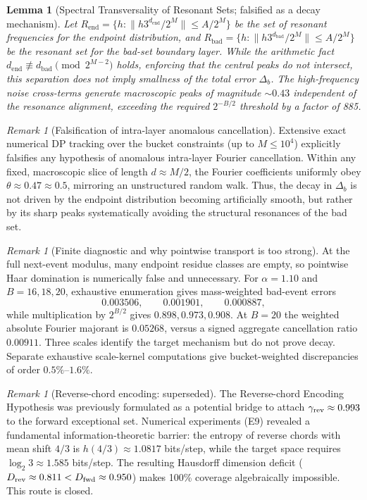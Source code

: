 \documentclass[12pt,a4paper]{article}
\newtheorem{lemma}[theorem]{Lemma}
\theoremstyle{remark}
\newtheorem{remark}[theorem]{Remark}
\begin{document}
\begin{lemma}[Spectral Transversality of Resonant Sets; falsified as a decay mechanism]
\label{lem:spectral_transversality}
Let $R_{\text{end}} = \{h : \|h 3^{d_{\text{end}}} / 2^M\| \le A/2^M\}$ be the set of resonant frequencies for the endpoint distribution, and $R_{\text{bad}} = \{h : \|h 3^{d_{\text{bad}}} / 2^M\| \le A/2^M\}$ be the resonant set for the bad-set boundary layer.
While the arithmetic fact $d_{\text{end}} \not\equiv d_{\text{bad}} \pmod{2^{M-2}}$ holds, enforcing that the central peaks do not intersect, this separation does not imply smallness of the total error $\Delta_b$. The high-frequency noise cross-terms generate macroscopic peaks of magnitude $\sim 0.43$ independent of the resonance alignment, exceeding the required $2^{-B/2}$ threshold by a factor of 885.
\end{lemma}

\begin{remark}[Falsification of intra-layer anomalous cancellation]
Extensive exact numerical DP tracking over the bucket constraints (up to $M \le 10^4$) explicitly falsifies any hypothesis of anomalous intra-layer Fourier cancellation. Within any fixed, macroscopic slice of length $d \approx M/2$, the Fourier coefficients uniformly obey $\theta \approx 0.47 \approx 0.5$, mirroring an unstructured random walk. Thus, the decay in $\Delta_b$ is not driven by the endpoint distribution becoming artificially smooth, but rather by its sharp peaks systematically avoiding the structural resonances of the bad set.
\end{remark}

\begin{remark}[Finite diagnostic and why pointwise transport is too strong]
At the full next-event modulus, many endpoint residue classes are empty, so
pointwise Haar domination is numerically false and unnecessary.  For
$\alpha=1.10$ and $B=16,18,20$, exhaustive enumeration gives mass-weighted
bad-event errors
\[
 0.003506,\qquad0.001901,\qquad0.000887,
\]
while multiplication by $2^{B/2}$ gives $0.898,0.973,0.908$.  At $B=20$ the
weighted absolute Fourier majorant is $0.05268$, versus a signed aggregate
cancellation ratio $0.00911$.  Three scales identify the target mechanism but
do not prove decay.  Separate exhaustive scale-kernel computations give
bucket-weighted discrepancies of order $0.5\%$--$1.6\%$.
\end{remark}

\begin{remark}[Reverse-chord encoding: superseded]
\label{rem:reverse_encoding_superseded}
The Reverse-chord Encoding Hypothesis was previously formulated as a
potential bridge to attach $\gamma_{\rm rev} \approx 0.993$ to the forward
exceptional set. Numerical experiments (E9) revealed a fundamental
information-theoretic barrier: the entropy of reverse chords with mean
shift $4/3$ is $h(4/3) \approx 1.0817$ bits/step, while the target space
requires $\log_2 3 \approx 1.585$ bits/step. The resulting Hausdorff
dimension deficit ($D_{\rm rev} \approx 0.811 < D_{\rm fwd} \approx 0.950$)
makes 100\% coverage algebraically impossible. This route is closed.
\end{remark}
\end{document}
